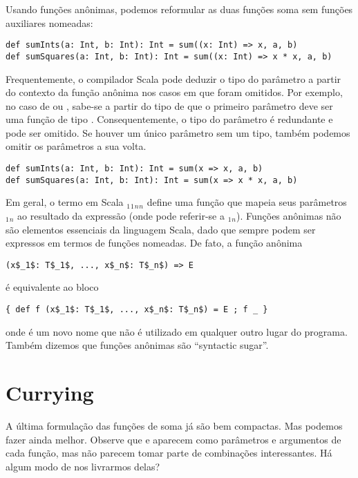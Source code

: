 Usando fun\c{c}\~{o}es an\^{o}nimas, podemos reformular as duas fun\c{c}\~{o}es soma sem
fun\c{c}\~{o}es auxiliares nomeadas:
\begin{lstlisting}
def sumInts(a: Int, b: Int): Int = sum((x: Int) => x, a, b)
def sumSquares(a: Int, b: Int): Int = sum((x: Int) => x * x, a, b)
\end{lstlisting}

Frequentemente, o compilador Scala pode deduzir o tipo do par\^{a}metro a partir
do contexto da fun\c{c}\~{a}o an\^{o}nima nos casos em que foram omitidos.
Por exemplo, no caso de  ou , sabe-se a partir do 
tipo de  que o primeiro par\^{a}metro deve ser uma fun\c{c}\~{a}o de tipo .
Consequentemente, o tipo do par\^{a}metro  \'{e} redundante e pode ser omitido. Se
houver um \'{u}nico par\^{a}metro sem um tipo, tamb\'{e}m podemos omitir os par\^{a}metros a sua volta. 
   
\begin{lstlisting}
def sumInts(a: Int, b: Int): Int = sum(x => x, a, b)
def sumSquares(a: Int, b: Int): Int = sum(x => x * x, a, b)
\end{lstlisting}

Em geral, o termo em Scala 
 $_1$$_1$$_n$$_n$ 
define uma fun\c{c}\~{a}o que mapeia seus par\^{a}metros $_1$$_n$
ao resultado da express\~{a}o  (onde  pode referir-se a   
$_1$$_n$). Fun\c{c}\~{o}es an\^{o}nimas n\~{a}o s\~{a}o elementos essenciais
da linguagem Scala, dado que sempre podem ser expressos em termos de fun\c{c}\~{o}es
nomeadas. De fato, a fun\c{c}\~{a}o an\^{o}nima 

\begin{lstlisting}
(x$_1$: T$_1$, ..., x$_n$: T$_n$) => E
\end{lstlisting}
\'{e} equivalente ao bloco
\begin{lstlisting}
{ def f (x$_1$: T$_1$, ..., x$_n$: T$_n$) = E ; f _ }
\end{lstlisting}
onde  \'{e} um novo nome que n\~{a}o \'{e} utilizado em qualquer outro lugar do programa.
Tamb\'{e}m dizemos que fun\c{c}\~{o}es an\^{o}nimas s\~{a}o ``syntactic sugar''. 

\section{Currying}

A \'{u}ltima formula\c{c}\~{a}o das fun\c{c}\~{o}es de soma j\'{a} s\~{a}o bem compactas. Mas 
podemos fazer ainda melhor. Observe que  e  aparecem como 
par\^{a}metros e argumentos de cada fun\c{c}\~{a}o, mas n\~{a}o parecem tomar parte de 
combina\c{c}\~{o}es interessantes. H\'{a} algum modo de nos livrarmos delas?

